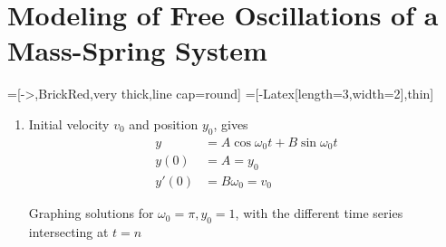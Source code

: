 \section{Modeling of Free Oscillations of a Mass-Spring System}

=[->,BrickRed,very thick,line cap=round]
=[-{Latex[length=3,width=2]},thin]

\begin{enumerate}
    \item Initial velocity $ v_{0} $ and position $ y_{0} $, gives
          \begin{align}
              y     & = A \cos \omega_{0}t + B \sin \omega_{0}t \\
              y(0)  & = A = y_{0}                               \\
              y'(0) & = B\omega_{0} = v_{0}
          \end{align}

          Graphing solutions for $ \omega_{0} = \pi, y_{0} = 1$, with the different time series
          intersecting at $ t = n $
          \begin{figure}[H]
              \centering
          \end{figure}


\end{enumerate}
